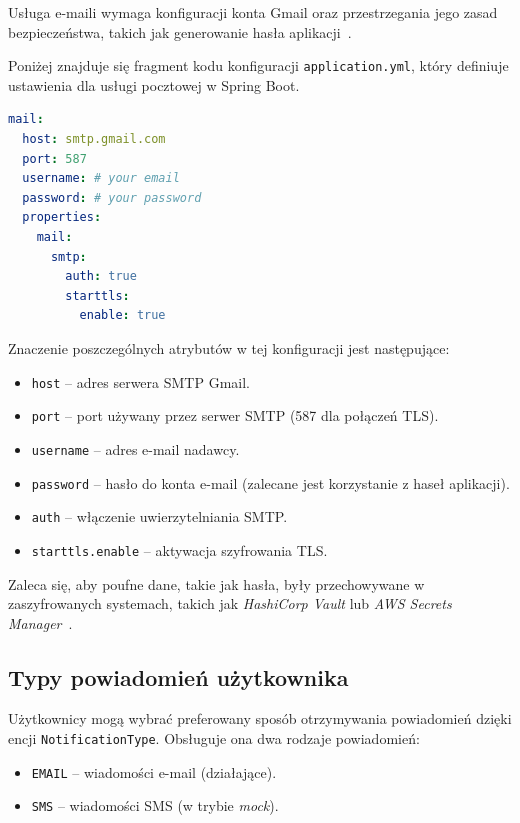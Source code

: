 Usługa e-maili wymaga konfiguracji konta Gmail oraz przestrzegania jego zasad bezpieczeństwa, takich jak generowanie hasła aplikacji~\cite{gmail_api}.

Poniżej znajduje się fragment kodu konfiguracji \texttt{application.yml}, który definiuje ustawienia dla usługi pocztowej w Spring Boot.

\begin{lstlisting}[language=yaml, caption=Fragment konfiguracji poczty w \texttt{application.yml}]
mail:
  host: smtp.gmail.com
  port: 587
  username: # your email
  password: # your password
  properties:
    mail:
      smtp:
        auth: true
        starttls:
          enable: true
\end{lstlisting}

Znaczenie poszczególnych atrybutów w tej konfiguracji jest następujące:
\begin{itemize}
    \item \texttt{host} -- adres serwera SMTP Gmail.
    \item \texttt{port} -- port używany przez serwer SMTP (587 dla połączeń TLS).
    \item \texttt{username} -- adres e-mail nadawcy.
    \item \texttt{password} -- hasło do konta e-mail (zalecane jest korzystanie z haseł aplikacji).
    \item \texttt{auth} -- włączenie uwierzytelniania SMTP.
    \item \texttt{starttls.enable} -- aktywacja szyfrowania TLS.
\end{itemize}

Zaleca się, aby poufne dane, takie jak hasła, były przechowywane w zaszyfrowanych systemach, takich jak \emph{HashiCorp Vault} lub \emph{AWS Secrets Manager}~\cite{hashicorp_vault, aws_secret}.

\subsection{Typy powiadomień użytkownika}

Użytkownicy mogą wybrać preferowany sposób otrzymywania powiadomień dzięki encji \texttt{NotificationType}. Obsługuje ona dwa rodzaje powiadomień:
\begin{itemize}
    \item \texttt{EMAIL} -- wiadomości e-mail (działające).
    \item \texttt{SMS} -- wiadomości SMS (w trybie \emph{mock}).
\end{itemize}

